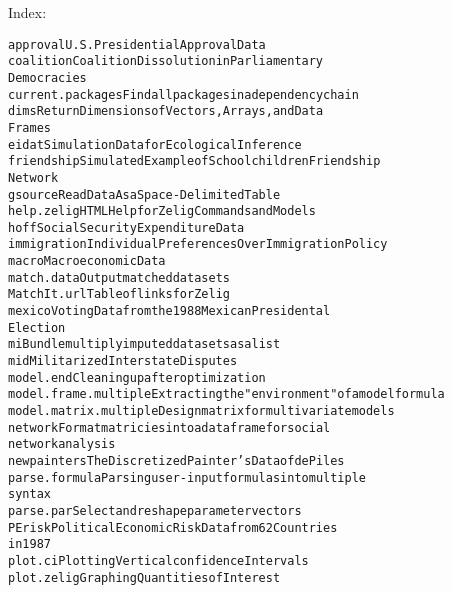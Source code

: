 \begin{Details}\relax
{}

Index:
\begin{alltt}
approval                U.S. Presidential Approval Data
coalition               Coalition Dissolution in Parliamentary
                        Democracies
current.packages        Find all packages in a dependency chain
dims                    Return Dimensions of Vectors, Arrays, and Data
                        Frames
eidat                   Simulation Data for Ecological Inference
friendship              Simulated Example of Schoolchildren Friendship
                        Network
gsource                 Read Data As a Space-Delimited Table
help.zelig              HTML Help for Zelig Commands and Models
hoff                    Social Security Expenditure Data
immigration             Individual Preferences Over Immigration Policy
macro                   Macroeconomic Data
match.data              Output matched data sets
MatchIt.url             Table of links for Zelig
mexico                  Voting Data from the 1988 Mexican Presidental
                        Election
mi                      Bundle multiply imputed data sets as a list
mid                     Militarized Interstate Disputes
model.end               Cleaning up after optimization
model.frame.multiple    Extracting the "environment" of a model formula
model.matrix.multiple   Design matrix for multivariate models
network                 Format matricies into a data frame for social
                        network analysis
newpainters             The Discretized Painter's Data of de Piles
parse.formula           Parsing user-input formulas into multiple
                        syntax
parse.par               Select and reshape parameter vectors
PErisk                  Political Economic Risk Data from 62 Countries
                        in 1987
plot.ci                 Plotting Vertical confidence Intervals
plot.zelig              Graphing Quantities of Interest

\end{alltt}
\end{Details}
